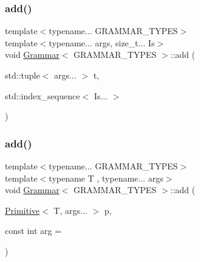 \subsubsection{\texorpdfstring{add()}{add()}\hspace{0.1cm}{\footnotesize\ttfamily [2/5]}}
{\footnotesize\ttfamily template$<$typename... G\+R\+A\+M\+M\+A\+R\+\_\+\+T\+Y\+P\+ES$>$ \\
template$<$typename... args, size\+\_\+t... Is$>$ \\
void \hyperlink{class_grammar}{Grammar}$<$ G\+R\+A\+M\+M\+A\+R\+\_\+\+T\+Y\+P\+ES $>$\+::add (\begin{DoxyParamCaption}\item[{std\+::tuple$<$ args... $>$}]{t,  }\item[{std\+::index\+\_\+sequence$<$ Is... $>$}]{ }\end{DoxyParamCaption})\hspace{0.3cm}{\ttfamily [inline]}}

\mbox{\label{class_grammar_a86dfa9ce87af1779799e617bb3252220}} 
\subsubsection{\texorpdfstring{add()}{add()}\hspace{0.1cm}{\footnotesize\ttfamily [3/5]}}
{\footnotesize\ttfamily template$<$typename... G\+R\+A\+M\+M\+A\+R\+\_\+\+T\+Y\+P\+ES$>$ \\
template$<$typename T , typename... args$>$ \\
void \hyperlink{class_grammar}{Grammar}$<$ G\+R\+A\+M\+M\+A\+R\+\_\+\+T\+Y\+P\+ES $>$\+::add (\begin{DoxyParamCaption}\item[{\hyperlink{struct_primitive}{Primitive}$<$ T, args... $>$}]{p,  }\item[{const int}]{arg = {} }\end{DoxyParamCaption})\hspace{0.3cm}{\ttfamily [inline]}}

\mbox{\label{class_grammar_a52b751ef5987563d4045692199dba16c}} 
